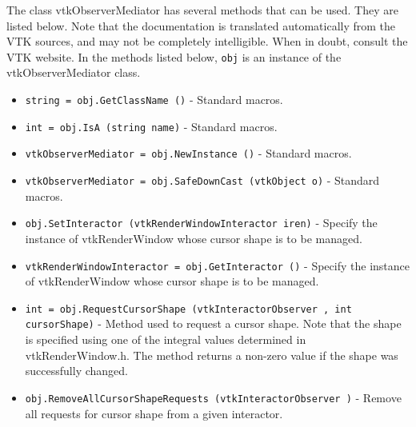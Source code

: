 The class vtkObserverMediator has several methods that can be used.
  They are listed below.
Note that the documentation is translated automatically from the VTK sources,
and may not be completely intelligible.  When in doubt, consult the VTK website.
In the methods listed below, \verb|obj| is an instance of the vtkObserverMediator class.
\begin{itemize}
\item  \verb|string = obj.GetClassName ()| -  Standard macros.

\item  \verb|int = obj.IsA (string name)| -  Standard macros.

\item  \verb|vtkObserverMediator = obj.NewInstance ()| -  Standard macros.

\item  \verb|vtkObserverMediator = obj.SafeDownCast (vtkObject o)| -  Standard macros.

\item  \verb|obj.SetInteractor (vtkRenderWindowInteractor iren)| -  Specify the instance of vtkRenderWindow whose cursor shape is
 to be managed.

\item  \verb|vtkRenderWindowInteractor = obj.GetInteractor ()| -  Specify the instance of vtkRenderWindow whose cursor shape is
 to be managed.

\item  \verb|int = obj.RequestCursorShape (vtkInteractorObserver , int cursorShape)| -  Method used to request a cursor shape. Note that the shape is specified
 using one of the integral values determined in vtkRenderWindow.h. The 
 method returns a non-zero value if the shape was successfully changed.

\item  \verb|obj.RemoveAllCursorShapeRequests (vtkInteractorObserver )| -  Remove all requests for cursor shape from a given interactor.

\end{itemize}
